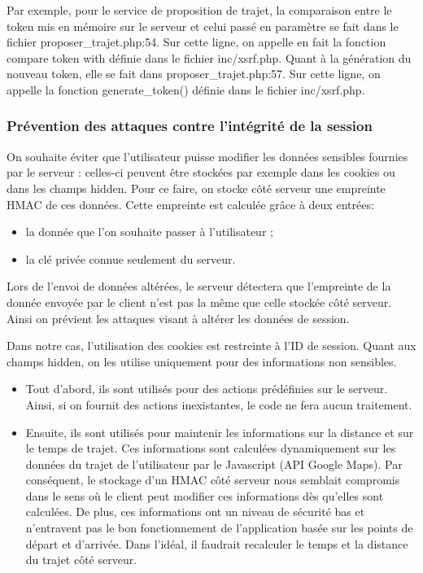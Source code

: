 \documentclass[a4paper]{article}
\begin{document}
Par exemple, pour le service de proposition de trajet, la comparaison entre
le token mis en mémoire sur le serveur et celui passé en paramètre se fait
dans le fichier proposer\_trajet.php:54. Sur cette ligne, on appelle en
fait la fonction compare token with définie dans le fichier
inc/xsrf.php. Quant à la génération du nouveau token, elle se fait dans
proposer\_trajet.php:57.  Sur cette ligne, on appelle la fonction
generate\_token() définie dans le fichier inc/xsrf.php.
 		
\subsubsection{Prévention des attaques contre l'intégrité de la session}
On souhaite éviter que l'utilisateur puisse modifier les données sensibles fournies par le serveur : celles-ci
peuvent être stockées par exemple dans les cookies ou dans les champs hidden. 
Pour ce faire, on stocke côté serveur une empreinte
HMAC de ces données. Cette empreinte est
calculée grâce à deux entrées:

\begin{itemize}
	\item la donnée que l'on souhaite passer à l'utilisateur ;
	\item la clé privée connue seulement du serveur.
\end{itemize}

Lors de l'envoi de données altérées,
le serveur détectera que l'empreinte de la donnée envoyée par le client
n'est pas la même que celle stockée côté serveur. Ainsi on prévient les
attaques visant à altérer les données de session.

Dans notre cas, l'utilisation des cookies est restreinte à l'ID de session.
Quant aux champs hidden, on les utilise uniquement pour des informations non
sensibles.
\begin{itemize}
	\item Tout d'abord, ils sont utilisés pour des actions prédéfinies sur le serveur. 
	Ainsi, si on fournit des actions inexistantes, le code ne fera aucun traitement.
	\item Ensuite, ils sont utilisés pour maintenir les informations sur la distance
	et sur le temps de trajet. Ces informations sont calculées dynamiquement sur les données
	du trajet de l'utilisateur par le Javascript (API Google Maps). Par conséquent, 
	le stockage d'un HMAC côté serveur nous semblait compromis dans le sens où le
	client peut modifier ces informations dès qu'elles sont calculées. 
	De plus, ces informations ont un niveau de sécurité bas et n'entravent pas
	le bon fonctionnement de l'application basée sur les points de départ et d'arrivée. 
	Dans l'idéal, il faudrait recalculer le temps et la distance du trajet côté serveur.
\end{itemize}
\end{document}
